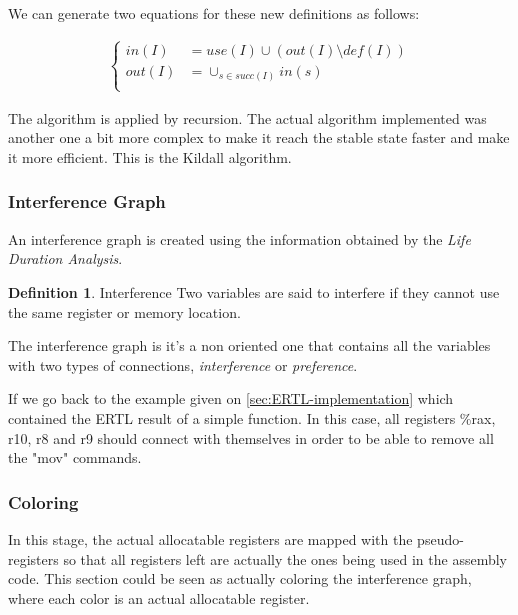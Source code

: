 \documentclass[conference]{IEEEtran}
\theoremstyle{definition}
\newtheorem{definition}{Definition}[section]
\begin{document}
We can generate two equations for these new definitions as follows:

\begin{align*}
	\left\{ 
	\begin{array}{cl} 
		in(I) & = use(I) \cup (out(I) \setminus def(I)) \\
		out(I) & = \cup_{s \in succ(I)}in(s) \\
	\end{array}
	\right.
\end{align*}

The algorithm is applied by recursion. The actual algorithm implemented was another one a bit more complex to make it reach the stable state faster and make it more efficient. This is the Kildall algorithm.


\subsubsection{Interference Graph}

An interference graph is created using the information obtained by the \textit{Life Duration Analysis}.

\theoremstyle{definition}
\begin{definition}{Interference}
	Two variables are said to interfere if they cannot use the same register or memory location.
\end{definition}

The interference graph is it's a non oriented one that contains all the variables with two types of connections, \textit{interference} or \textit{preference}.

If we go back to the example given on \ref{sec:ERTL-implementation} which contained the ERTL result of a simple function. In this case, all registers \%rax, r10, r8 and r9 should connect with themselves in order to be able to remove all the "mov" commands.

\subsubsection{Coloring} \label{sec:coloring}

In this stage, the actual allocatable registers are mapped with the pseudo-registers so that all registers left are actually the ones being used in the assembly code. This section could be seen as actually coloring the interference graph, where each color is an actual allocatable register.
\end{document}
